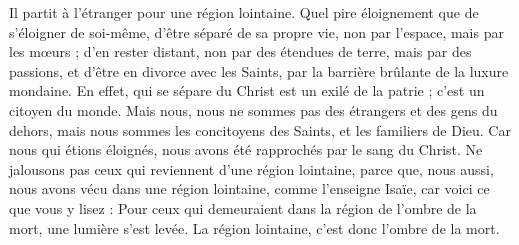 Il partit à l’étranger pour une région lointaine. Quel pire éloignement que de s’éloigner de soi-même, d’être séparé de sa propre vie, non par l’espace, mais par les mœurs ; d’en rester distant, non par des étendues de terre, mais par des passions, et d’être en divorce avec les Saints, par la barrière brûlante de la luxure mondaine. En effet, qui se sépare du Christ est un exilé de la patrie ; c’est un citoyen du monde. Mais nous, nous ne sommes pas des étrangers et des gens du dehors, mais nous sommes les concitoyens des Saints, et les familiers de Dieu. Car nous qui étions éloignés, nous avons été rapprochés par le sang du Christ. Ne jalousons pas ceux qui reviennent d’une région lointaine, parce que, nous aussi, nous avons vécu dans une région lointaine, comme l’enseigne Isaïe, car voici ce que vous y lisez : Pour ceux qui demeuraient dans la région de l'ombre de la mort, une lumière s'est levée. La région lointaine, c’est donc l’ombre de la mort.
